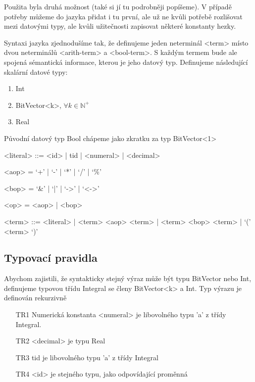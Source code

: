 \documentclass{fithesis2}
\begin{document}
Použita byla druhá možnost (také si jí tu podrobněji popíšeme). V případě potřeby můžeme do jazyka přidat i tu první, ale už ne kvůli potřebě rozlišovat mezi datovými typy, ale kvůli užitečnosti zapisovat některé konstanty hezky.

Syntaxi jazyka zjednodušíme tak, že definujeme jeden neterminál <term> místo dvou neterminálů <arith-term> a <bool-term>. S každým termem bude ale spojená sémantická informace, kterou je jeho datový typ. Definujeme následující skalární datové typy:

\begin{enumerate}
\item Int
\item BitVector<k>, $\forall k \in \mathbb{N^+}$
\item Real
\end{enumerate}

Původní datový typ Bool chápeme jako zkratku za typ BitVector<1>

\begin{grammar}
<literal> ::= <id> | tid | <numeral> | <decimal>

<aop> = `+'  | `-' | `*' | `/' |  `\%'

<bop> = `&' | `|' | `->' | `<->'

<op> = <aop> | <bop>

<term> ::= <literal> | <term> <aop> <term> | <term> <bop> <term> | `(' <term> `)'
\end{grammar}

\subsection{Typovací pravidla}
Abychom zajistili, že syntakticky stejný výraz může být typu BitVector nebo Int, definujeme typovou třídu Integral se členy BitVector<k> a Int. Typ výrazu je definován rekurzivně

\begin{enumerate}
\item[TR1] Numerická konstanta <numeral> je libovolného typu 'a' z třídy Integral.
\item[TR2] <decimal> je typu Real
\item[TR3] tid je libovolného typu 'a' z třídy Integral
\item[TR4] <id> je stejného typu, jako odpovídající proměnná
\end{enumerate}
\end{document}
